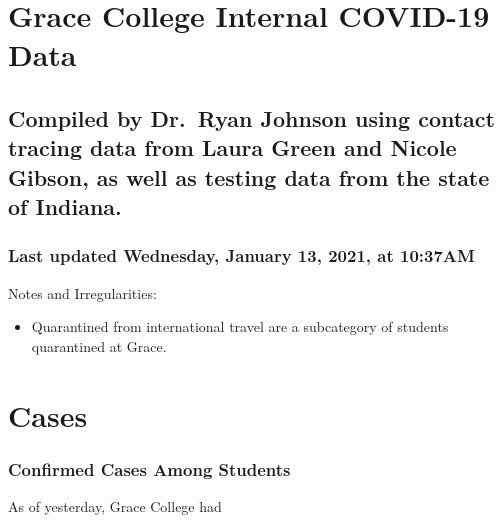\documentclass[
]{article}
\providecommand{\tightlist}{%
  \setlength{\itemsep}{0pt}\setlength{\parskip}{0pt}}
\begin{document}
\hypertarget{grace-college-internal-covid-19-data}{%
\section{Grace College Internal COVID-19
Data}\label{grace-college-internal-covid-19-data}}

\hypertarget{compiled-by-dr.-ryan-johnson-using-contact-tracing-data-from-laura-green-and-nicole-gibson-as-well-as-testing-data-from-the-state-of-indiana.}{%
\subsection{Compiled by Dr.~Ryan Johnson using contact tracing data from
Laura Green and Nicole Gibson, as well as testing data from the state of
Indiana.}\label{compiled-by-dr.-ryan-johnson-using-contact-tracing-data-from-laura-green-and-nicole-gibson-as-well-as-testing-data-from-the-state-of-indiana.}}

\hypertarget{last-updated-wednesday-january-13-2021-at-1037am}{%
\subsubsection{Last updated Wednesday, January 13, 2021, at
10:37AM}\label{last-updated-wednesday-january-13-2021-at-1037am}}

\vspace{2 in}

Notes and Irregularities:

\begin{itemize}
\tightlist
\item
  Quarantined from international travel are a subcategory of students
  quarantined at Grace.
\end{itemize}

\newpage

\hypertarget{cases}{%
\section{Cases}\label{cases}}

\hypertarget{confirmed-cases-among-students}{%
\subsubsection{Confirmed Cases Among
Students}\label{confirmed-cases-among-students}}

As of yesterday, Grace College had
\end{document}
